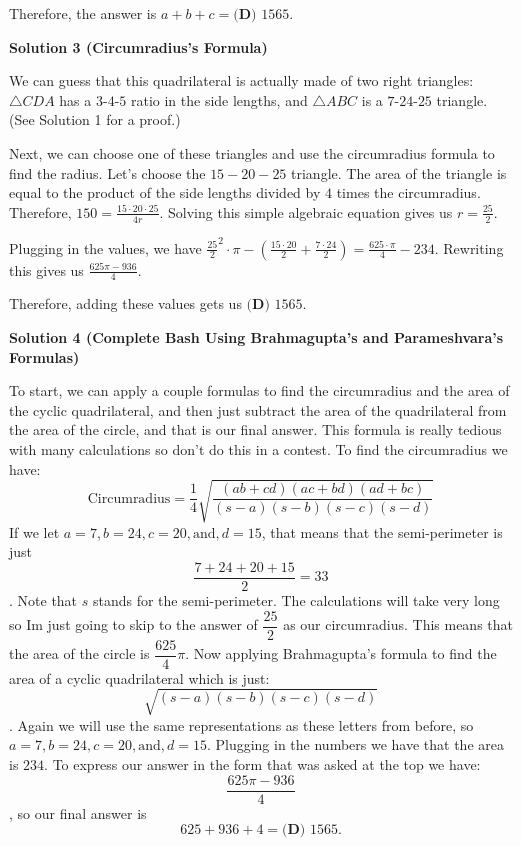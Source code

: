 \begin{enumerate}
 Therefore, the answer is $a+b+c=\boxed{\textbf{(D) } 1565}.$




\textbf{Solution 3 (Circumradius's Formula)}

We can guess that this quadrilateral is actually made of two right triangles: $\triangle CDA$ has a $3 \text{-} 4 \text{-} 5$ ratio in the side lengths, and $\triangle ABC$ is a $7 \text{-} 24 \text{-} 25$ triangle. (See Solution 1 for a proof.)

 Next, we can choose one of these triangles and use the circumradius formula to find the radius. Let's choose the $15-20-25$ triangle. The area of the triangle is equal to the product of the side lengths divided by $4$ times the circumradius. Therefore, $150 = \frac{15\cdot20\cdot25}{4r}$. Solving this simple algebraic equation gives us $r = \frac{25}{2}$. 

 Plugging in the values, we have $\frac{25}{2}^2\cdot\pi - \left(\frac{15\cdot20}{2}+\frac{7\cdot24}{2}\right) = \frac{625\cdot\pi}{4} - 234$. Rewriting this gives us $\frac{625\pi-936}{4}$.

 Therefore, adding these values gets us $\boxed{\textbf{(D) } 1565}.$




\textbf{Solution 4 (Complete Bash Using Brahmagupta’s and Parameshvara’s Formulas)}

To start, we can apply a couple formulas to find the circumradius and the area of the cyclic quadrilateral, and then just subtract the area of the quadrilateral from the area of the circle, and that is our final answer. This formula is really tedious with many calculations so don't do this in a contest. To find the circumradius we have: 
 \[\text{Circumradius} = \frac{1}{4} \sqrt{\frac{(ab + cd)(ac + bd)(ad + bc)}{(s-a)(s-b)(s-c)(s-d)}}\]If we let $a = 7, b = 24, c = 20, \text{and}, d = 15$, that means that the semi-perimeter is just 
 \[\dfrac{7+24+20+15}{2} = 33\]. Note that $s$ stands for the semi-perimeter. The calculations will take very long so Im just going to skip to the answer of $\dfrac{25}{2}$ as our circumradius. This means that the area of the circle is $\dfrac{625}{4}\pi$. Now applying Brahmagupta's formula to find the area of a cyclic quadrilateral which is just: 
 \[\sqrt{(s-a)(s-b)(s-c)(s-d)}\]. Again we will use the same representations as these letters from before, so $a = 7, b = 24, c = 20, \text{and}, d = 15$. Plugging in the numbers we have that the area is $234$. To express our answer in the form that was asked at the top we have: 
 \[\dfrac{625\pi-936}{4}\], so our final answer is 
 \[625+936+4 = \boxed{\textbf{(D) } 1565}.\]


\end{enumerate}
